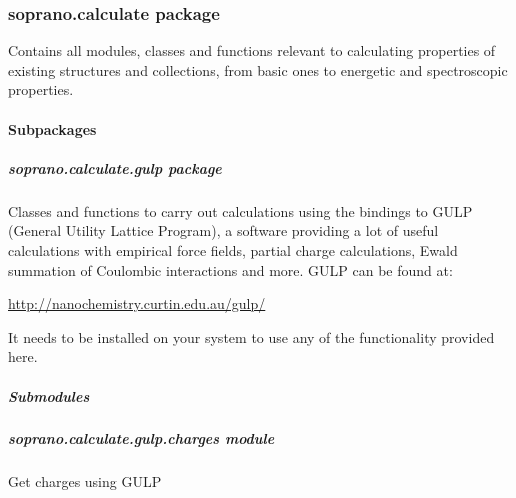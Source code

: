 \documentclass[letterpaper,10pt,english]{sphinxmanual}
\begin{document}
\subsubsection{soprano.calculate package}
\label{doctree/soprano.calculate:module-soprano.calculate}\label{doctree/soprano.calculate::doc}\label{doctree/soprano.calculate:soprano-calculate-package}
Contains all modules, classes and functions relevant
to calculating properties of existing structures and collections,
from basic ones to energetic and spectroscopic properties.


\paragraph{Subpackages}
\label{doctree/soprano.calculate:subpackages}

\subparagraph{soprano.calculate.gulp package}
\label{doctree/soprano.calculate.gulp:module-soprano.calculate.gulp}\label{doctree/soprano.calculate.gulp::doc}\label{doctree/soprano.calculate.gulp:soprano-calculate-gulp-package}
Classes and functions to carry out calculations using the bindings to GULP
(General Utility Lattice Program), a software providing a lot of useful
calculations with empirical force fields, partial charge calculations, Ewald
summation of Coulombic interactions and more. GULP can be found at:

\url{http://nanochemistry.curtin.edu.au/gulp/}

It needs to be installed on your system to use any of the functionality
provided here.


\subparagraph{Submodules}
\label{doctree/soprano.calculate.gulp:submodules}

\subparagraph{soprano.calculate.gulp.charges module}
\label{doctree/soprano.calculate.gulp.charges:soprano-calculate-gulp-charges-module}\label{doctree/soprano.calculate.gulp.charges:module-soprano.calculate.gulp.charges}\label{doctree/soprano.calculate.gulp.charges::doc}
Get charges using GULP
\end{document}
